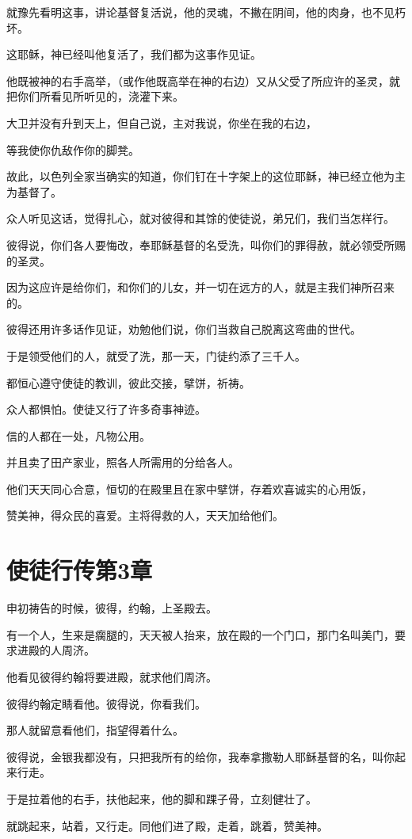 \documentclass[12pt,oneside]{book}
\begin{document}
就豫先看明这事，讲论基督复活说，他的灵魂，不撇在阴间，他的肉身，也不见朽坏。

这耶稣，神已经叫他复活了，我们都为这事作见证。

他既被神的右手高举，（或作他既高举在神的右边）又从父受了所应许的圣灵，就把你们所看见所听见的，浇灌下来。

大卫并没有升到天上，但自己说，主对我说，你坐在我的右边，

等我使你仇敌作你的脚凳。

故此，以色列全家当确实的知道，你们钉在十字架上的这位耶稣，神已经立他为主为基督了。

众人听见这话，觉得扎心，就对彼得和其馀的使徒说，弟兄们，我们当怎样行。

彼得说，你们各人要悔改，奉耶稣基督的名受洗，叫你们的罪得赦，就必领受所赐的圣灵。

因为这应许是给你们，和你们的儿女，并一切在远方的人，就是主我们神所召来的。

彼得还用许多话作见证，劝勉他们说，你们当救自己脱离这弯曲的世代。

于是领受他们的人，就受了洗，那一天，门徒约添了三千人。

都恒心遵守使徒的教训，彼此交接，擘饼，祈祷。

众人都惧怕。使徒又行了许多奇事神迹。

信的人都在一处，凡物公用。

并且卖了田产家业，照各人所需用的分给各人。

他们天天同心合意，恒切的在殿里且在家中擘饼，存着欢喜诚实的心用饭，

赞美神，得众民的喜爱。主将得救的人，天天加给他们。

\chapter{使徒行传第3章}
申初祷告的时候，彼得，约翰，上圣殿去。

有一个人，生来是瘸腿的，天天被人抬来，放在殿的一个门口，那门名叫美门，要求进殿的人周济。

他看见彼得约翰将要进殿，就求他们周济。

彼得约翰定睛看他。彼得说，你看我们。

那人就留意看他们，指望得着什么。

彼得说，金银我都没有，只把我所有的给你，我奉拿撒勒人耶稣基督的名，叫你起来行走。

于是拉着他的右手，扶他起来，他的脚和踝子骨，立刻健壮了。

就跳起来，站着，又行走。同他们进了殿，走着，跳着，赞美神。
\end{document}
